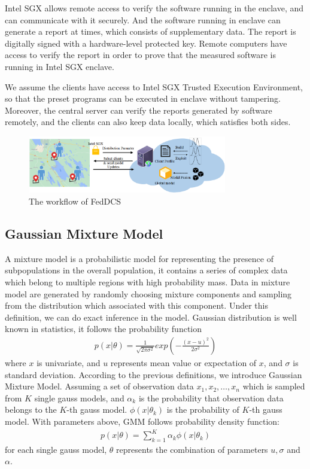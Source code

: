 \documentclass[conference]{IEEEtran}
\begin{document}
Intel SGX allows remote access to verify the software running in the enclave, and can 
communicate with it securely. And the software running in enclave can generate a report 
at times, which consists of supplementary data. The report is digitally signed with a hardware-level
 protected key. Remote computers have access to verify the report in order to prove 
that the measured software is running in Intel SGX enclave.

We assume the clients have access to Intel SGX Trusted Execution Environment, 
so that the preset programs can be executed in enclave without tampering.
Moreover, the central server can verify the 
reports generated by software remotely, and the clients can also keep data locally, 
which satisfies both sides.
\begin{figure}
    \centering
    \includegraphics[height=2.5cm,width=8.7cm]{workflow.png}
    \caption{The workflow of FedDCS}
    \label{workflow}
\end{figure}
\subsection{Gaussian Mixture Model}
A mixture model is a probabilistic model for representing the presence of subpopulations 
in the overall population, it contains a series of complex data which belong to multiple 
regions with high probability mass. Data in mixture model are generated by randomly choosing
mixture components and sampling from the distribution which associated with this component.
Under this definition, we can do exact inference in the model.
Gaussian distribution is well known in statistics, it follows the probability function
  \begin{align}
    p(x|\theta) = \frac{1}{\sqrt{2\pi\sigma^{2}}}exp(-\frac{(x-u)^2}{2\sigma^2})
  \end{align}
where $x$ is univariate, and $u$ represents mean value or expectation of $x$, and $\sigma$ is standard 
deviation.
According to the previous definitions, we introduce Gaussian Mixture Model. Assuming a set of observation data 
$x_1,x_2,\dots,x_n$ which is sampled from $K$ single gauss models, and $\alpha_k$ is the
probability that observation data belongs to the $K$-th gauss model. $\phi (x|\theta_k)$ is the
probability of $K$-th gauss model. With parameters above, GMM follows probability density function:
  \begin{align}
    p(x|\theta) = \sum_{k=1}^{K}\alpha_k\phi(x|\theta_k)  
  \end{align}
for each single gauss model, $\theta$ represents the combination of parameters $u,\sigma$ and $\alpha$.
\end{document}
